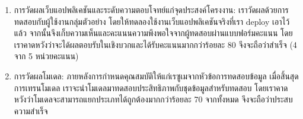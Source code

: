 \begin{enumerate}
    \item การวัดผลเว็บแอปพลิเคชันและระดับความตอบโจทย์แก่จุดประสงค์โครงงาน: เราวัดผลด้วยการทดสอบกับผู้ใช้งานกลุ่มตัวอย่าง โดยให้ทดลองใช้งานเว็บแอปพลิเคชันจริงที่เรา deploy เอาไว้แล้ว จากนั้นจึงเก็บความเห็นและคะแนนความพึงพอใจจากผู้ทดสอบผ่านแบบฟอร์มคะแนน
          โดยเราคาดหวังว่าจะได้ผลตอบรับในเชิงบวกและได้รับคะแนนมากกว่าร้อยละ 80 จึงจะถือว่าสำเร็จ (4 จาก 5 หน่วยคะแนน)
    \item การวัดผลโมเดล: ภายหลังการกำหนดคุณสมบัติให้แก่เรซูเมจากหัวข้อการทดสอบข้อมูล
          เมื่อสิ้นสุดการเทรนโมเดล เราจะนำโมเดลมาทดสอบประสิทธิภาพกับชุดข้อมูลสำหรับทดสอบ โดยเราคาดหวังว่าโมเดลจะสามารถแยกประเภทได้ถูกต้องมากกว่าร้อยละ 70 จากทั้งหมด จึงจะถือว่าประสบความสำเร็จ
\end{enumerate}









